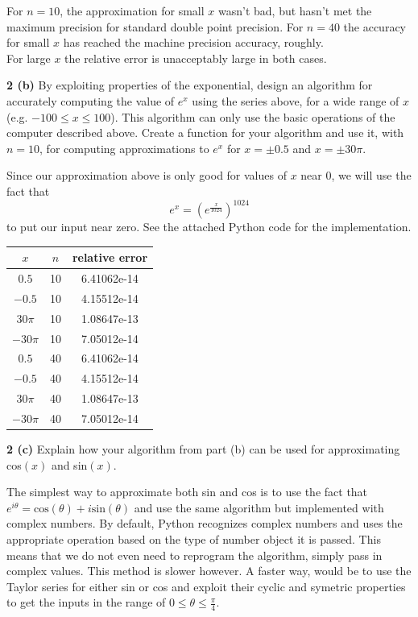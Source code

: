 \documentclass[12pt]{article}
\begin{document}
	For $n=10$, the approximation for small $x$ wasn't bad, but hasn't met the maximum precision for standard double point precision. For $n=40$ the accuracy for small $x$ has reached the machine precision accuracy, roughly. \\
	For large $x$ the relative error is unacceptably large in both cases. \bigbreak
	
\hspace{-7 ex}\textbf{2 (b)} By exploiting properties of the exponential, design an algorithm for accurately computing the value of $e^x$ using the series above, for a wide range of $x$ (e.g. $−100 \leq x \leq 100$). This algorithm can only use the basic operations of the computer described above. Create a function for your algorithm and use it, with $n = 10$, for computing approximations to $e^x$ for $x = \pm0.5$ and $x = \pm 30\pi$. \bigbreak

	Since our approximation above is only good for values of $x$ near $0$, we will use the fact that $$e^x=(e^{\frac{x}{1024}})^{1024}$$ to put our input near zero. See the attached Python code for the implementation. \\
	
	\begin{center}
		\begin{tabular}{|c|c|c|}
			\hline
			$x$ & $n$ & relative error \\ \hline
			$0.5$ & 10 & 6.41062e-14 \\ \hline
			$-0.5$ & 10 & 4.15512e-14 \\ \hline
			$30\pi$ & 10 & 1.08647e-13 \\ \hline
			$-30\pi$ & 10 & 7.05012e-14 \\ \hline
			$0.5$ & 40 & 6.41062e-14 \\ \hline
			$-0.5$ & 40 & 4.15512e-14 \\ \hline
			$30\pi$ & 40 & 1.08647e-13 \\ \hline
			$-30\pi$ & 40 & 7.05012e-14 \\ \hline
		\end{tabular}
	\end{center}

\hspace{-7 ex}\textbf{2 (c)} Explain how your algorithm from part (b) can be used for approximating cos$(x)$ and sin$(x)$. \bigbreak

	The simplest way to approximate both sin and cos is to use the fact that $e^{i\theta} = \text{cos}(\theta) + i\text{sin}(\theta)$ and use the same algorithm but implemented with complex numbers. By default, Python recognizes complex numbers and uses the appropriate operation based on the type of number object it is passed. This means that we do not even need to reprogram the algorithm, simply pass in complex values. This method is slower however. A faster way, would be to use the Taylor series for either sin or cos and exploit their cyclic and symetric properties to get the inputs in the range of $0 \leq \theta \leq \frac{\pi}{4}$.
\end{document}
